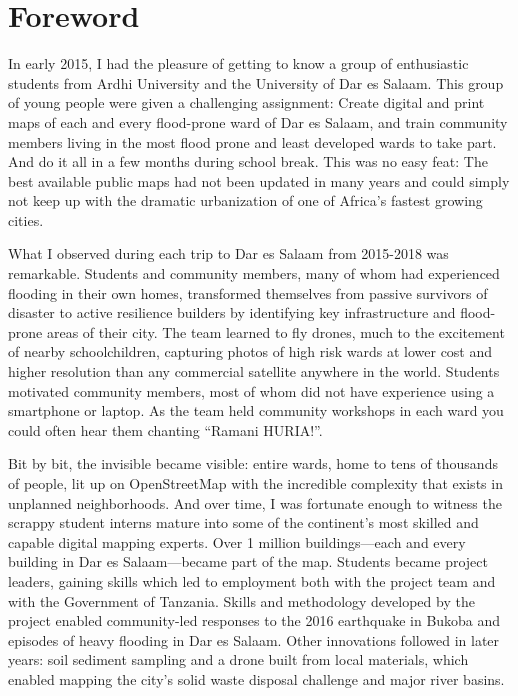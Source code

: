 \documentclass[a4paper,12pt,twoside]{article}
\begin{document}
\section{Foreword}
\begin{multicols}{2}
In early 2015, I had the pleasure of getting to know a group of enthusiastic students from Ardhi University and the University of Dar es Salaam. This group of young people were given a challenging assignment: Create digital and print maps of each and every flood-prone ward of Dar es Salaam, and train community members living in the most flood prone and least developed wards to take part. And do it all in a few months during school break. This was no easy feat: The best available public maps had not been updated in many years and could simply not keep up with the dramatic urbanization of one of Africa’s fastest growing cities.
 
What I observed during each trip to Dar es Salaam from 2015-2018 was remarkable. Students and community members, many of whom had experienced flooding in their own homes, transformed themselves from passive survivors of disaster to active resilience builders by identifying key infrastructure and flood-prone areas of their city. The team learned to fly drones, much to the excitement of nearby schoolchildren, capturing photos of high risk wards at lower cost and higher resolution than any commercial satellite anywhere in the world. Students motivated community members, most of whom did not have experience using a smartphone or laptop. As the team held community workshops in each ward you could often hear them chanting “Ramani HURIA!”.
 
Bit by bit, the invisible became visible: entire wards, home to tens of thousands of people, lit up on OpenStreetMap with the incredible complexity that exists in unplanned neighborhoods. And over time, I was fortunate enough to witness the scrappy student interns mature into some of the continent’s most skilled and capable digital mapping experts. Over 1 million buildings---each and every building in Dar es Salaam---became part of the map. Students became project leaders, gaining skills which led to employment both with the project team and with the Government of Tanzania. Skills and methodology developed by the project enabled community-led responses to the 2016 earthquake in Bukoba and episodes of heavy flooding in Dar es Salaam. Other innovations followed in later years: soil sediment sampling and a drone built from local materials, which enabled mapping the city’s solid waste disposal challenge and major river basins.
 

\end{multicols}
\end{document}
